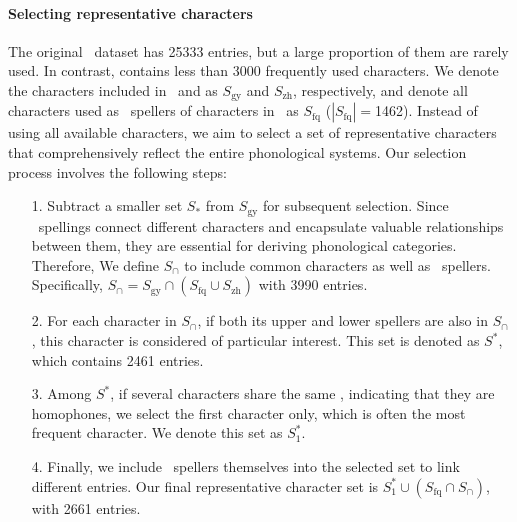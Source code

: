 \paragraph{Selecting representative characters} %
The original \qy~dataset has 25333 entries, but a large proportion of them are rarely used. 
In contrast, \citet{zihui} contains less than 3000 frequently used characters.
We denote the characters included in \gy~and \citet{zihui} as $S_{\text{gy}}$ and $S_{\text{zh}}$, respectively, and denote all characters used as \fq~spellers of characters in \gy~as $S_{\text{fq}}$ ($|S_{\text{fq}}|=$1462).
Instead of using all available characters, we aim to select a set of representative characters that comprehensively reflect the entire phonological systems. Our selection process involves the following steps:
\begin{enumerate}
    \item[1.] Subtract a smaller set $S_{*}$ from $S_{\text{gy}}$ for subsequent selection. Since \fq~spellings connect different characters and encapsulate valuable relationships between them, they are essential for deriving phonological categories. Therefore, We define $S_{\cap}$ to include common characters as well as \fq~spellers. Specifically, $S_{\cap}=S_{\text{gy}} \cap (S_{\text{fq}} \cup S_{\text{zh}})$ with 3990 entries. 
    \item[2.] For each character in $S_{\cap}$, if both its upper and lower spellers are also in $S_{\cap}$, this character is considered of particular interest. This set is denoted as $S^{*}$, which contains 2461 entries.
    \item[3.] Among $S^{*}$, if several characters share the same \fq, indicating that they are homophones, we select the first character only, which is often the most frequent character. We denote this set as $S^{*}_{1}$.
    \item[4.] Finally, we include \fq~spellers themselves into the selected set to link different entries. Our final representative character set is $S^{*}_{1} \cup (S_{\text{fq}} \cap S_{\cap})$, with 2661 entries.
\end{enumerate}



